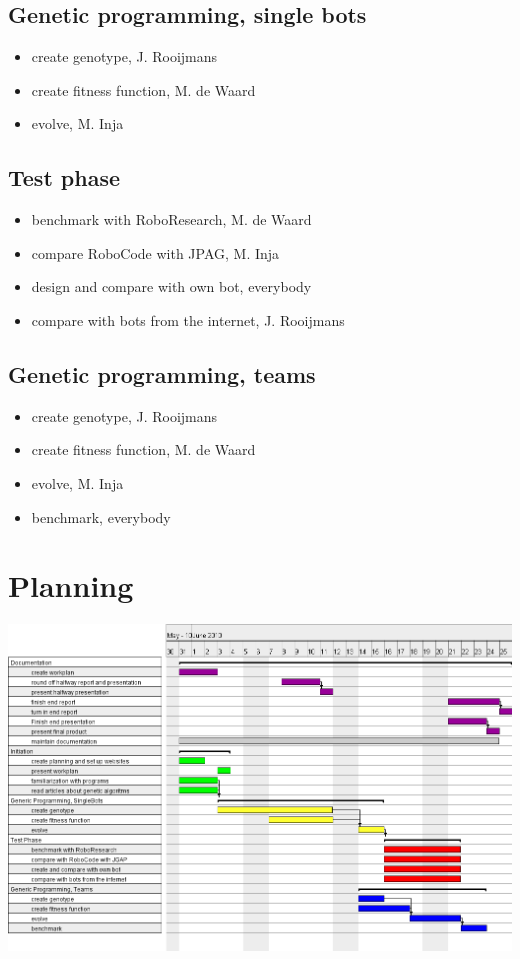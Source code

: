\documentclass[a4paper,10pt]{article}
\begin{document}
\subsection{Genetic programming, single bots}
\begin{itemize}
\item create genotype, J. Rooijmans
\item create fitness function, M. de Waard
\item evolve, M. Inja
\end{itemize}

\subsection{Test phase}
\begin{itemize}
\item benchmark with RoboResearch, M. de Waard
\item compare RoboCode with JPAG, M. Inja
\item design and compare with own bot, everybody
\item compare with bots from the internet, J. Rooijmans
\end{itemize}


\subsection{Genetic programming, teams}
\begin{itemize}
\item create genotype, J. Rooijmans
\item create fitness function, M. de Waard
\item evolve, M. Inja
\item benchmark, everybody
\end{itemize}
\newpage


\newpage
\appendix
\section{Planning}
\label{planning}
\includegraphics[height=0.75\textwidth, angle=-90]{planning.png}
\end{document}
